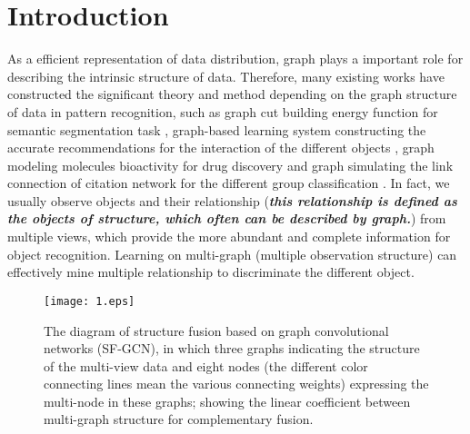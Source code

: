 \documentclass[review]{elsarticle}
\begin{document}
\section{Introduction}
As a efficient representation of data distribution, graph plays a important role for describing the intrinsic structure of data. Therefore, many existing works have constructed the significant theory and method depending on the graph structure of data in pattern recognition, such as graph cut building energy function for semantic segmentation task \cite{veksler2019efficient}, graph-based learning system constructing the accurate recommendations for the interaction of the different objects \cite{monti2017geometric} \cite{ying2018graph}, graph modeling molecules bioactivity for drug discovery \cite{defferrard2016convolutional} \cite{gilmer2017neural} and graph simulating the link connection of citation network for the different group classification \cite{defferrard2016convolutional}\cite{gilmer2017neural}\cite{khan2019multi}. In fact, we usually observe objects and their relationship (\textbf{\textsl{this relationship is defined as the objects of structure, which often can be described by graph.}}) from multiple views, which provide the more abundant and complete information for object recognition. Learning on multi-graph (multiple observation structure) can effectively mine multiple relationship to discriminate the different object.

\begin{figure*}[ht]
  \begin{center}
\texttt{[image: 1.eps]}
\end{center}
\vspace{-0.2in}
 \caption{The diagram of structure fusion based on graph convolutional networks (SF-GCN), in which three graphs indicating the structure of the multi-view data and eight nodes (the different color connecting lines mean the various connecting weights) expressing the multi-node in these graphs; showing the linear coefficient between multi-graph structure for complementary fusion.}
  \label{SF-GCN1}
 \end{figure*}
\end{document}
